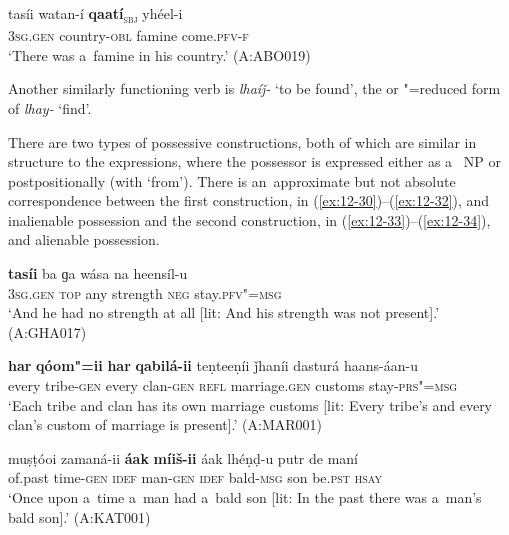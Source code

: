 \begin{exe}
\ex
\label{ex:12-29}
\gll tasíi watan-í {\ob}\textbf{qaatí}{\cb}\textsubscript{\textsc{\upshape sbj}} yhéel-i \\
\textsc{3sg.gen} country-\textsc{obl} famine come.\textsc{pfv-f} \\
\glt `There was a~famine in his country.' (A:ABO019)
\end{exe}

Another similarly functioning verb is \textit{lhaíǰ-} `to be found', the  or "=reduced form of \textit{lhay-} `find'.


 There are two types of possessive constructions, both of which are similar in structure to the  expressions, where the possessor is expressed either as a~ NP or postpositionally (with `from'). There is an~approximate but not absolute correspondence between the first construction, in (\ref{ex:12-30})--(\ref{ex:12-32}), and inalienable possession and the second construction, in (\ref{ex:12-33})--(\ref{ex:12-34}), and alienable possession.

\begin{exe}
\ex
\label{ex:12-30}
\gll \textbf{tasíi} ba ɡa wása na heensíl-u \\
\textsc{3sg.gen} \textsc{top} any strength \textsc{neg} stay.\textsc{pfv"=msg} \\
\glt `And he had no strength at all [lit: And his strength was not present].' (A:GHA017)
\end{exe}

\ea
\label{ex:12-31}
\gll \textbf{har} \textbf{qóom"=ii} \textbf{har} \textbf{qabilá-ii} teṇteeṇíi ǰhaníi dasturá haans-áan-u\\
every tribe-\textsc{gen} every clan-\textsc{gen} \textsc{refl} marriage.\textsc{gen}  customs stay-\textsc{prs"=msg}\\
\glt `Each tribe and clan has its own marriage customs [lit: Every tribe's and every clan's custom of marriage is present].' (A:MAR001)

\ex
\label{ex:12-32}
\gll muṣṭóoi zamaná-ii \textbf{áak} \textbf{míiš-ii} áak lhéṇḍ-u putr de maní \\
of.past time-\textsc{gen} \textsc{idef} man-\textsc{gen} \textsc{idef} bald-\textsc{msg} son be.\textsc{pst} \textsc{hsay} \\
\glt `Once upon a~time a~man had a~bald son [lit: In the past there was a~man's bald son].' (A:KAT001)
\z


